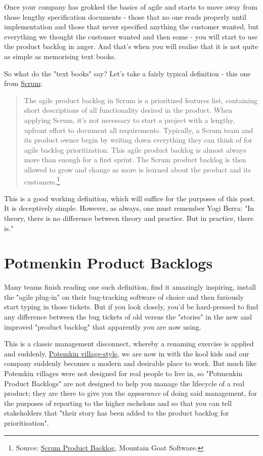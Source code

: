 \documentclass{book}
\begin{document}
Once your company has grokked the basics of agile and starts to move
away from those lengthy specification documents - those that no one
reads properly until implementation and those that never specified
anything the customer wanted, but everything we thought the customer
wanted and then some - you will start to use the product backlog in
anger. And that's when you will realise that it is not quite as simple
as memorising text books.

So what do the "text books" say? Let's take a fairly typical
definition - this one from \href{https://en.wikipedia.org/wiki/Scrum_(software_development)}{Scrum}:

\begin{quote}
The agile product backlog in Scrum is a prioritized features list,
containing short descriptions of all functionality desired in the
product. When applying Scrum, it's not necessary to start a project
with a lengthy, upfront effort to document all
requirements. Typically, a Scrum team and its product owner begin by
writing down everything they can think of for agile backlog
prioritization. This agile product backlog is almost always more than
enough for a first sprint. The Scrum product backlog is then allowed
to grow and change as more is learned about the product and its
customers.\footnote{Source: \href{https://www.mountaingoatsoftware.com/agile/scrum/product-backlog}{Scrum Product Backlog}, Mountain Goat Software.}
\end{quote}

This is a good working definition, which will suffice for the purposes
of this post. It is deceptively simple. However, as always, one must
remember Yogi Berra: "In theory, there is no difference between theory
and practice. But in practice, there is."

\section*{Potmenkin Product Backlogs}
\label{sec-2}

Many teams finish reading one such definition, find it amazingly
inspiring, install the "agile plug-in" on their bug-tracking software
of choice and then furiously start typing in those tickets. But if you
look closely, you'd be hard-pressed to find any difference between the
bug tickets of old versus the "stories" in the new and improved
"product backlog" that apparently you are now using.

This is a classic management disconnect, whereby a renaming exercise
is applied and suddenly, \href{https://en.wikipedia.org/wiki/Potemkin_village}{Potemkin village-style}, we are now in with
the kool kids and our company suddenly becomes a modern and desirable
place to work. But much like Potemkin villages were not designed for
real people to live in, so "Potmenkin Product Backlogs" are not
designed to help you manage the lifecycle of a real product; they are
there to give you the \emph{appearance} of doing said management, for the
purposes of reporting to the higher eschelons and so that you can tell
stakeholders that "their story has been added to the product backlog
for prioritisation".
\end{document}
